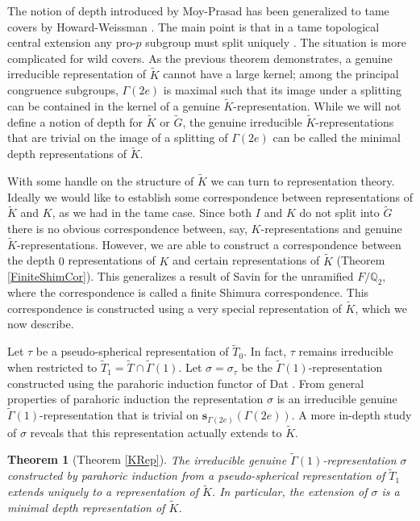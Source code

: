 \documentclass[10pt, letterpaper]{amsart}
\theoremstyle{plain}
\newtheorem{Thm}[equation]{Theorem}
\theoremstyle{definition}
\numberwithin{equation}{section}
\newcommand{\Gt}{\widetilde{G}}
\newcommand{\Kt}{\widetilde{K}}
\newcommand{\Tt}{\widetilde{T}}
\newcommand{\Gammat}{\widetilde{\Gamma}}
\newcommand{\s}{\mathbf{s}}
\begin{document}
The notion of depth introduced by Moy-Prasad \cite{MP94,MP96} has been generalized to tame covers by Howard-Weissman \cite{HW09}. The main point is that in a tame topological central extension any pro-$p$ subgroup must split uniquely \cite[Proposition 2.3]{HW09}. The situation is more complicated for wild covers. As the previous theorem demonstrates, a genuine irreducible representation of $\Kt$ cannot have a large kernel; among the principal congruence subgroups, $\Gamma(2e)$ is maximal such that its image under a splitting can be contained in the kernel of a genuine $\Kt$-representation. While we will not define a notion of depth for $\Kt$ or $\Gt$, the genuine irreducible $\Kt$-representations that are trivial on the image of a splitting of $\Gamma(2e)$ can be called the minimal depth representations of $\Kt$. 

With some handle on the structure of $\Kt$ we can turn to representation theory. Ideally we would like to establish some correspondence between representations of $\Kt$ and $K$, as we had in the tame case. Since both $I$ and $K$ do not split into $\Gt$ there is no obvious correspondence between, say, $K$-representations and genuine $\Kt$-representations. However, we are able to construct a correspondence between the depth $0$ representations of $K$ and certain representations of $\Kt$ (Theorem \ref{FiniteShimCor}). This generalizes a result of Savin \cite{S12} for the unramified $F/\mathbb{Q}_{2}$, where the correspondence is called a finite Shimura correspondence. This correspondence is constructed using a very special representation of $\Kt$, which we now describe.

Let $\tau$ be a pseudo-spherical representation of $\Tt_{0}$. In fact, $\tau$ remains irreducible when restricted to $\Tt_{1}=\Tt\cap \Gammat(1)$. Let $\sigma=\sigma_{\tau}$ be the $\Gammat(1)$-representation constructed using the parahoric induction functor of Dat \cite[Section 2.6]{D09}. From general properties of parahoric induction the representation $\sigma$ is an irreducible genuine $\Gammat(1)$-representation that is trivial on $\s_{\Gamma(2e)}(\Gamma(2e))$. A more in-depth study of $\sigma$ reveals that this representation actually extends to $\Kt$.

\begin{Thm}[Theorem \ref{KRep}]\label{P:sigma_extends_to_K_Intro}
    The irreducible genuine $\Gammat(1)$-representation $\sigma$ constructed by parahoric induction from a pseudo-spherical representation of $\Tt_{1}$ extends uniquely to a representation of $\Kt$. In particular, the extension of $\sigma$ is a minimal depth representation of $\Kt$.
\end{Thm}
\end{document}
